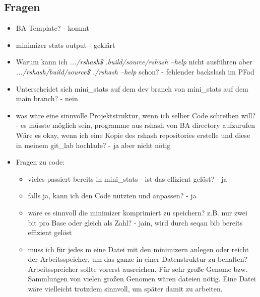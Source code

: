 \documentclass{article}
\begin{document}
\subsection*{Fragen}
	\begin{itemize}
		\item BA Template? - kommt
		\item minimizer stats output - geklärt
		\item Warum kann ich \textit{.../rshash\$ .build/source/rshash --help} nicht ausführen aber \textit{.../rshash/build/source\$ ./rshash --help} schon? - fehlender backslash im PFad
		\item Unterscheidet sich mini\_stats auf dem dev branch von mini\_stats auf dem main branch? - nein
		\item was wäre eine sinnvolle Projektstruktur, wenn ich selber Code schreiben will? - es müsste möglich sein, programme aus rshash von BA directory aufzurufen
		Wäre es okay, wenn ich eine  Kopie des rshash repositories erstelle und diese in meinem git\_lab hochlade? - ja aber nicht nötig
		\item Fragen zu code:
		\begin{itemize}
			\item vieles passiert bereits in mini\_stats - ist das effizient gelöst? - ja
			\item falls ja, kann ich den Code nutzten und anpassen? - ja
			\item wäre es sinnvoll die minimizer komprimiert zu speichern? z.B. nur zwei bit pro Base oder gleich als Zahl? - jain, wird durch seqan bib bereits effizient gelöst
			\item muss ich für jedes m eine Datei mit den minimizern anlegen oder reicht der Arbeitsspeicher, um das ganze in einer Datenstruktur zu behalten? - Arbeitsspreicher sollte vorerst ausreichen. Für sehr große Genome bzw. Sammlungen von vielen großen Genomen wären dateien nötig. Eine Datei wäre vielleicht trotzdem sinnvoll, um später damit zu arbeiten.
		\end{itemize}
	\end{itemize}
\end{document}
